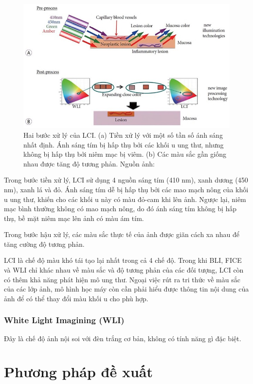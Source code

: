 \documentclass[12pt]{extreport}
\begin{document}
\begin{figure}[H]
    \centering
    \includegraphics[width=0.9\linewidth]{figure21.jpg}
    \caption{Hai bước xử lý của LCI. (a) Tiền xử lý với một số tần số ánh sáng nhất định. Ánh sáng tím bị hấp thụ bởi các khối u ung thư, nhưng không bị hấp thụ bởi niêm mạc bị viêm. (b) Các màu sắc gần giống nhau được tăng độ tương phản. Nguồn ảnh: \cite{pmid31700545}}
\end{figure}

Trong bước tiền xử lý, LCI sử dụng 4 nguồn sáng tím (410 nm), xanh dương (450 nm), xanh lá và đỏ. Ánh sáng tím dễ bị hấp thụ bởi các mao mạch nông của khối u ung thư, khiến cho các khối u này có màu đỏ-cam khi lên ảnh. Ngược lại, niêm mạc bình thường không có mao mạch nông, do đó ánh sáng tím không bị hấp thụ, bề mặt niêm mạc lên ảnh có màu ám tím.

Trong bước hậu xử lý, các màu sắc thực tế của ảnh được giãn cách xa nhau để tăng cường độ tương phản.

LCI là chế độ màu khó tái tạo lại nhất trong cả 4 chế độ. Trong khi BLI, FICE và WLI chỉ khác nhau về màu sắc và độ tương phản của các đối tượng, LCI còn có thêm khả năng phát hiện mô ung thư. Ngoại việc rút ra tri thức về màu sắc của các lớp ảnh, mô hình học máy còn cần phải hiểu được thông tin nội dung của ảnh để có thể thay đổi màu khối u cho phù hợp.

\subsection{White Light Imagining (WLI)}

Đây là chế độ ảnh nội soi với đèn trắng cơ bản, không có tính năng gì đặc biệt.

\chapter{Phương pháp đề xuất}
\end{document}
